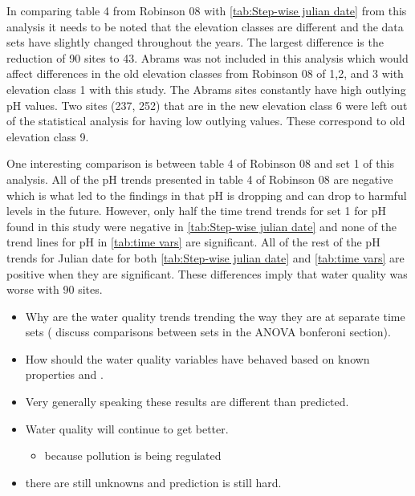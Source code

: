 In comparing table 4 from Robinson 08 with \autoref{tab:Step-wise julian date} from this analysis it needs to be noted that the elevation classes are different and the data sets have slightly changed throughout the years.  The largest difference is the reduction of 90 sites to 43.  Abrams was not included in this analysis which would affect differences in the old elevation classes from Robinson 08 of 1,2, and 3 with elevation class 1 with this study.  The Abrams sites constantly have high outlying pH values.  Two sites (237, 252) that are in the new elevation class 6 were left out of the statistical analysis for having low outlying values.  These correspond to old elevation class 9.

One interesting comparison is between table 4 of Robinson 08 and set 1 of this analysis.  All of the pH trends presented in table 4 of Robinson 08 are negative which is what led to the findings in \citet{robinson2008ph} that pH is dropping and can drop to harmful levels in the future.  However, only half the time trend trends for set 1 for pH found in this study were negative in \autoref{tab:Step-wise julian date} and none of the trend lines for pH in \autoref{tab:time vars} are significant.  All of the rest of the pH trends for Julian date for both \autoref{tab:Step-wise julian date} and \autoref{tab:time vars} are positive when they are significant.  These differences imply that water quality was worse with 90 sites.
\begin{itemize}
	\item Why are the water quality trends trending the way they are at separate time sets ( discuss comparisons between sets in the ANOVA bonferoni section).
	\item How should the water quality variables have behaved based on known properties and \citep{robinson2008ph}.%
	\item Very generally speaking these results are different than \citep{robinson2008ph} predicted.%
	\item Water quality will continue to get better. %
	\begin{itemize}
		\item because pollution is being regulated
	\end{itemize}
	\item there are still unknowns and prediction is still hard.
\end{itemize}
	
